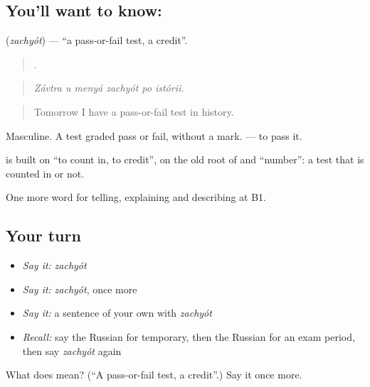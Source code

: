 \subsection*{You'll want to know: }
\textbf{} (\emph{zachyót}) — \textquotedblleft{}a pass-or-fail test, a credit\textquotedblright{}.

\begin{quote}
     .
\end{quote}

\begin{quote}
\emph{Závtra u menyá zachyót po istórii.}
\end{quote}

\begin{quote}
Tomorrow I have a pass-or-fail test in history.
\end{quote}

Masculine. A test graded pass or fail, without a mark. \emph{ } — to pass it.

\begin{cousinweb}
\textbf{} is built on \emph{} \textquotedblleft{}to count in, to credit\textquotedblright{}, on the old root of \emph{} and \emph{} \textquotedblleft{}number\textquotedblright{}: a test that is counted in or not.
\end{cousinweb}

\begin{grammarlens}[title={What you've built}]
One more word for telling, explaining and describing at B1.
\end{grammarlens}

\subsection*{Your turn}
\begin{itemize}
\raggedright
  \item \emph{Say it:} \emph{zachyót}
  \item \emph{Say it:} \emph{zachyót}, once more
  \item \emph{Say it:} a sentence of your own with \emph{zachyót}
  \item \emph{Recall:} say the Russian for temporary, then the Russian for an exam period, then say \emph{zachyót} again
\end{itemize}

\begin{tcolorbox}[breakable,colback=teal!4,colframe=teal!35!black,title={Before you move on}]
What does  mean? (\textquotedblleft{}A pass-or-fail test, a credit\textquotedblright{}.) Say it once more.
\end{tcolorbox}
